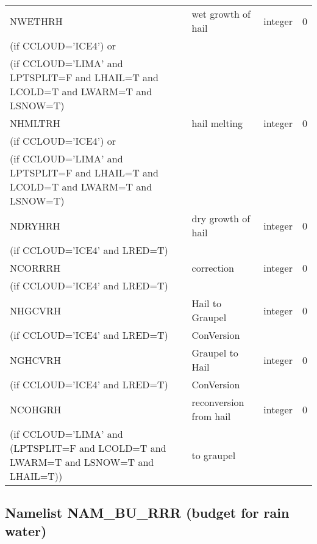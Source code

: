 \begin{longtable} {|p{}|p{}|>{\centering}p{}|p{}<{\centering}|}
NWETHRH  & wet growth of hail  & integer  &  0 \index{NWETHRH!\innam{NAM\_BU\_RRH}}\\ \nopagebreak
(if CCLOUD='ICE4') or & &   &  \\
(if CCLOUD='LIMA' and LPTSPLIT=F and LHAIL=T and LCOLD=T and LWARM=T and LSNOW=T) & &   &  \\\hline
NHMLTRH  & hail melting  & integer  &  0 \index{NHMLTRH!\innam{NAM\_BU\_RRH}}\\ \nopagebreak
(if CCLOUD='ICE4') or & &   &  \\
(if CCLOUD='LIMA' and LPTSPLIT=F and LHAIL=T and LCOLD=T and LWARM=T and LSNOW=T) & &   &  \\\hline
NDRYHRH  &  dry growth of hail & integer  &  0 \index{NDRYHRH!\innam{NAM\_BU\_RRH}}\\ \nopagebreak
(if CCLOUD='ICE4' and LRED=T) & &   &  \\\hline
NCORRRH  &  correction & integer  &  0 \index{NCORRRH!\innam{NAM\_BU\_RRH}}\\ \nopagebreak
(if CCLOUD='ICE4' and LRED=T) & &   &  \\\hline
NHGCVRH  & Hail to Graupel  & integer  &  0 \index{NHGCVRH!\innam{NAM\_BU\_RRH}}\\ \nopagebreak
(if CCLOUD='ICE4' and LRED=T) & ConVersion  &   &  \\\hline
NGHCVRH  & Graupel to Hail  & integer  &  0 \index{NGHCVRH!\innam{NAM\_BU\_RRH}}\\ \nopagebreak
(if CCLOUD='ICE4' and LRED=T) & ConVersion  &   &  \\\hline
NCOHGRH  & reconversion from hail  & integer  &  0 \index{NCOHGRH!\innam{NAM\_BU\_RRH}}\\ \nopagebreak
(if CCLOUD='LIMA' and (LPTSPLIT=F and LCOLD=T and LWARM=T and LSNOW=T and LHAIL=T)) &to graupel  &   &  \\\hline
\end{longtable}

\subsection{Namelist NAM\_BU\_RRR (budget for rain water)}

